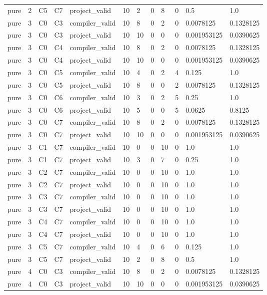 \begin{tabular}{llllllllllll}
pure & 2 & C5 & C7 & project\_valid & 10 & 2 & 0 & 8 & 0 & 0.5 & 1.0 \\
pure & 3 & C0 & C3 & compiler\_valid & 10 & 8 & 0 & 2 & 0 & 0.0078125 & 0.1328125 \\
pure & 3 & C0 & C3 & project\_valid & 10 & 10 & 0 & 0 & 0 & 0.001953125 & 0.0390625 \\
pure & 3 & C0 & C4 & compiler\_valid & 10 & 8 & 0 & 2 & 0 & 0.0078125 & 0.1328125 \\
pure & 3 & C0 & C4 & project\_valid & 10 & 10 & 0 & 0 & 0 & 0.001953125 & 0.0390625 \\
pure & 3 & C0 & C5 & compiler\_valid & 10 & 4 & 0 & 2 & 4 & 0.125 & 1.0 \\
pure & 3 & C0 & C5 & project\_valid & 10 & 8 & 0 & 0 & 2 & 0.0078125 & 0.1328125 \\
pure & 3 & C0 & C6 & compiler\_valid & 10 & 3 & 0 & 2 & 5 & 0.25 & 1.0 \\
pure & 3 & C0 & C6 & project\_valid & 10 & 5 & 0 & 0 & 5 & 0.0625 & 0.8125 \\
pure & 3 & C0 & C7 & compiler\_valid & 10 & 8 & 0 & 2 & 0 & 0.0078125 & 0.1328125 \\
pure & 3 & C0 & C7 & project\_valid & 10 & 10 & 0 & 0 & 0 & 0.001953125 & 0.0390625 \\
pure & 3 & C1 & C7 & compiler\_valid & 10 & 0 & 0 & 10 & 0 & 1.0 & 1.0 \\
pure & 3 & C1 & C7 & project\_valid & 10 & 3 & 0 & 7 & 0 & 0.25 & 1.0 \\
pure & 3 & C2 & C7 & compiler\_valid & 10 & 0 & 0 & 10 & 0 & 1.0 & 1.0 \\
pure & 3 & C2 & C7 & project\_valid & 10 & 0 & 0 & 10 & 0 & 1.0 & 1.0 \\
pure & 3 & C3 & C7 & compiler\_valid & 10 & 0 & 0 & 10 & 0 & 1.0 & 1.0 \\
pure & 3 & C3 & C7 & project\_valid & 10 & 0 & 0 & 10 & 0 & 1.0 & 1.0 \\
pure & 3 & C4 & C7 & compiler\_valid & 10 & 0 & 0 & 10 & 0 & 1.0 & 1.0 \\
pure & 3 & C4 & C7 & project\_valid & 10 & 0 & 0 & 10 & 0 & 1.0 & 1.0 \\
pure & 3 & C5 & C7 & compiler\_valid & 10 & 4 & 0 & 6 & 0 & 0.125 & 1.0 \\
pure & 3 & C5 & C7 & project\_valid & 10 & 2 & 0 & 8 & 0 & 0.5 & 1.0 \\
pure & 4 & C0 & C3 & compiler\_valid & 10 & 8 & 0 & 2 & 0 & 0.0078125 & 0.1328125 \\
pure & 4 & C0 & C3 & project\_valid & 10 & 10 & 0 & 0 & 0 & 0.001953125 & 0.0390625 \\

\end{tabular}
